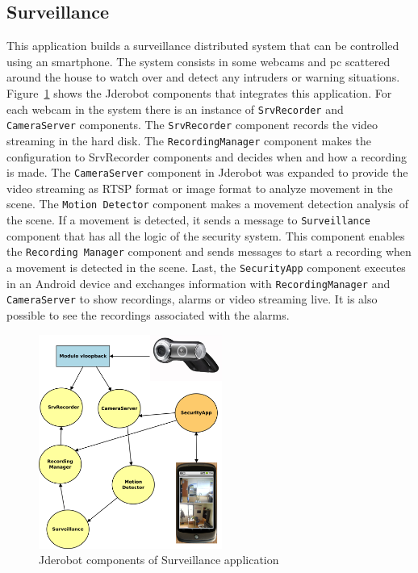 \documentclass[twocolumn]{svjour3}          %
\begin{document}
\subsection{Surveillance}

This application builds a surveillance distributed system that can be controlled using an smartphone. The system consists in some webcams and pc scattered around the house to watch over and detect any intruders or warning situations. Figure~\ref{fig:surveillance1} shows the Jderobot components that integrates this application. For each
webcam in the system there is an instance of \texttt{SrvRecorder} and
\texttt{CameraServer} components. The \texttt{SrvRecorder} component records the video streaming in the hard disk. The
\texttt{RecordingManager} component makes the configuration to
{SrvRecorder} components and decides when and how a recording is
made. The \texttt{CameraServer} component in Jderobot was expanded to provide the video streaming as
RTSP format or image format to analyze movement in the scene. The \texttt{Motion
  Detector} component makes a movement detection analysis of the
scene. If a movement is detected, it
sends a message to \texttt{Surveillance} component that has all the logic of
the security system. This component enables the \texttt{Recording Manager} component and sends messages to
start a recording when a movement is detected in the scene. Last, the
\texttt{SecurityApp} component executes in an Android device and
exchanges information with \texttt{RecordingManager} and
\texttt{CameraServer} to show recordings, alarms or video streaming live. It is also possible to see the recordings associated with the alarms. 

\begin{figure}
\includegraphics[width=6cm]{figs/surveillance-img1.png}
\caption{Jderobot components of Surveillance application}
\label{fig:surveillance1}
\end{figure}
\end{document}
